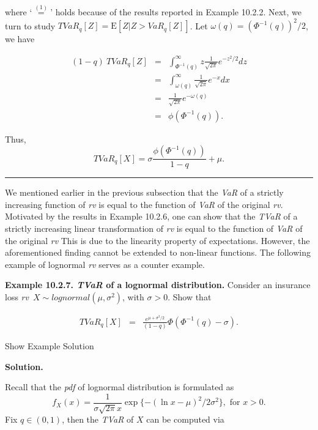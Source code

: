 \documentclass[]{book}
\theoremstyle{definition}
\theoremstyle{definition}
\theoremstyle{definition}
\theoremstyle{remark}
\begin{document}
where `\(\overset{(1)}{=}\)' holds because of the results reported in
Example 10.2.2. Next, we turn to study
\(TVaR_q[Z]=\mathrm{E}[Z|Z>VaR_q[Z]]\). Let
\(\omega(q)=(\Phi^{-1}(q))^2/2\), we have

\begin{eqnarray*}
  (1-q)\ TVaR_q[Z] &=& \int_{\Phi^{-1}(q)}^{\infty} z \frac{1}{\sqrt{2\pi}} e^{-z^2/2}dz\\
&=& \int_{\omega(q)}^{\infty}  \frac{1}{\sqrt{2\pi}} e^{-x}dx\\
&=& \frac{1}{\sqrt{2\pi}} e^{-\omega(q)}\\
&=& \phi(\Phi^{-1}(q)).
\end{eqnarray*}

Thus, \[
TVaR_q[X]=\sigma\frac{\phi(\Phi^{-1}(q))}{1-q}+\mu.
\]

\begin{center}\rule{0.5\linewidth}{\linethickness}\end{center}

We mentioned earlier in the previous subsection that the \emph{VaR} of a
strictly increasing function of \emph{rv} is equal to the function of
\emph{VaR} of the original \emph{rv}. Motivated by the results in
Example 10.2.6, one can show that the \emph{TVaR} of a strictly
increasing linear transformation of \emph{rv} is equal to the function
of \emph{VaR} of the original \emph{rv} This is due to the linearity
property of expectations. However, the aforementioned finding cannot be
extended to non-linear functions. The following example of lognormal
\emph{rv} serves as a counter example.

\textbf{Example 10.2.7. \emph{TVaR} of a lognormal distribution.}
Consider an insurance loss \emph{rv}~\(X\sim lognormal (\mu,\sigma^2)\),
with \(\sigma>0\). Show that

\begin{eqnarray*}
  TVaR_q[X] &=& \frac{e^{\mu+\sigma^2/2}}{(1-q)} \Phi(\Phi^{-1}(q)-\sigma).
\end{eqnarray*}

Show Example Solution

\hypertarget{toggleExamplePortMgt.2.7}{}
\textbf{Solution.}

Recall that the \emph{pdf} of lognormal distribution is formulated as \[
f_X(x)=\frac{1}{\sigma\sqrt{2\pi} x}\exp\{-(\ln x-\mu )^2/2\sigma^2 \}, \text{ for } x>0.
\] Fix \(q\in(0,1)\), then the \emph{TVaR} of \(X\) can be computed via
\end{document}
